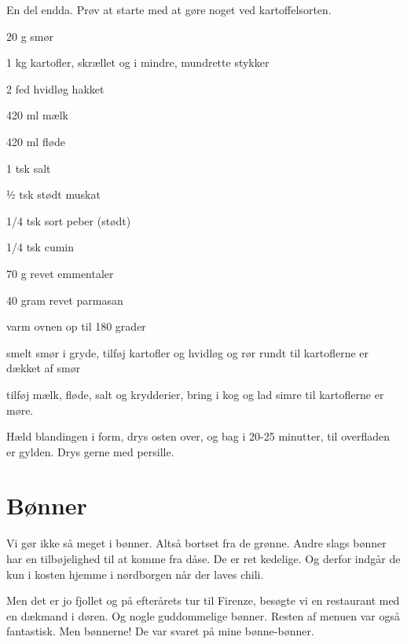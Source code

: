 \documentclass[
  letterpaper,
  DIV=11,
  numbers=noendperiod]{scrreprt}
\begin{document}
En del endda. Prøv at starte med at gøre noget ved kartoffelsorten.

20 g smør

1 kg kartofler, skrællet og i mindre, mundrette stykker

2 fed hvidløg hakket

420 ml mælk

420 ml fløde

1 tsk salt

½ tsk stødt muskat

1/4 tsk sort peber (stødt)

1/4 tsk cumin

70 g revet emmentaler

40 gram revet parmasan

varm ovnen op til 180 grader

smelt smør i gryde, tilføj kartofler og hvidløg og rør rundt til
kartoflerne er dækket af smør

tilføj mælk, fløde, salt og krydderier, bring i kog og lad simre til
kartoflerne er møre.

Hæld blandingen i form, drys osten over, og bag i 20-25 minutter, til
overfladen er gylden. Drys gerne med persille.

\hypertarget{buxf8nner}{%
\section{Bønner}\label{buxf8nner}}

Vi gør ikke så meget i bønner. Altså bortset fra de grønne. Andre slags
bønner har en tilbøjelighed til at komme fra dåse. De er ret kedelige.
Og derfor indgår de kun i kosten hjemme i nørdborgen når der laves
chili.

Men det er jo fjollet og på efterårets tur til Firenze, besøgte vi en
restaurant med en dækmand i døren. Og nogle guddommelige bønner. Resten
af menuen var også fantastisk. Men bønnerne! De var svaret på mine
bønne-bønner.
\end{document}

